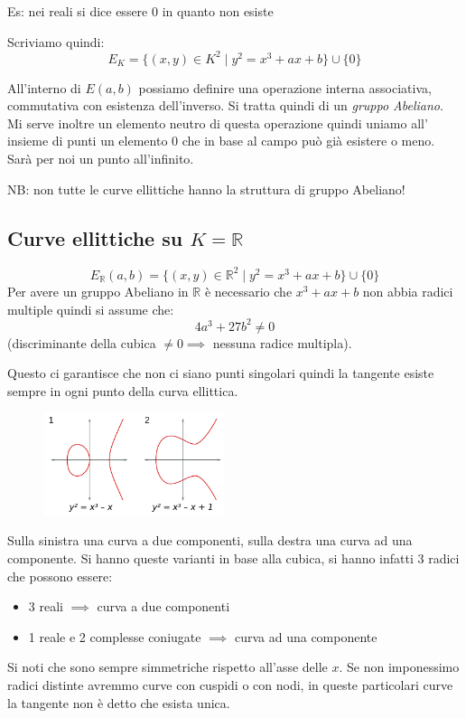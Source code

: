 Es: nei reali si dice essere 0 in quanto non esiste

Scriviamo quindi:
$$ E_K = \{ (x,y) \in K^2 \mid y^2 = x^3 + ax +b \} \cup \{0\} $$

All'interno di $E(a,b)$ possiamo definire una operazione interna associativa, commutativa con esistenza dell'inverso.
Si tratta quindi di un \emph{gruppo Abeliano}.
Mi serve inoltre un elemento neutro di questa operazione quindi uniamo all' insieme di punti un elemento 0 che in base al campo può già esistere o meno.
Sarà per noi un punto all'infinito.

NB: non tutte le curve ellittiche hanno la struttura di gruppo Abeliano!

\subsection{Curve ellittiche su $K=\mathbb{R}$}
$$ E_{\mathbb{R}}(a,b) = \{(x,y) \in \mathbb{R}^2 \mid y^2 = x^3 + ax +b \} \cup \{0\} $$
Per avere un gruppo Abeliano in $\mathbb{R}$ è necessario che $x^3 + ax + b$ non abbia radici multiple quindi si assume che:
$$ 4a^3 + 27b^2 \neq 0 $$
(discriminante della cubica $\neq 0 \implies $ nessuna radice multipla).

Questo ci garantisce che non ci siano punti singolari quindi la tangente esiste sempre in ogni punto della curva ellittica.

\begin{figure}[H]
    \centering
    \includegraphics[width=200px]{ECC_1.png}
\end{figure}

Sulla sinistra una curva a due componenti, sulla destra una curva ad una componente.
Si hanno queste varianti in base alla cubica, si hanno infatti 3 radici che possono essere:
\begin{itemize}
    \item 3 reali $\implies$ curva a due componenti
    \item 1 reale e 2 complesse coniugate $\implies$ curva ad una componente
\end{itemize}

Si noti che sono sempre simmetriche rispetto all'asse delle $x$.
Se non imponessimo radici distinte avremmo curve con cuspidi o con nodi, in queste particolari curve la tangente non è detto che esista unica.

